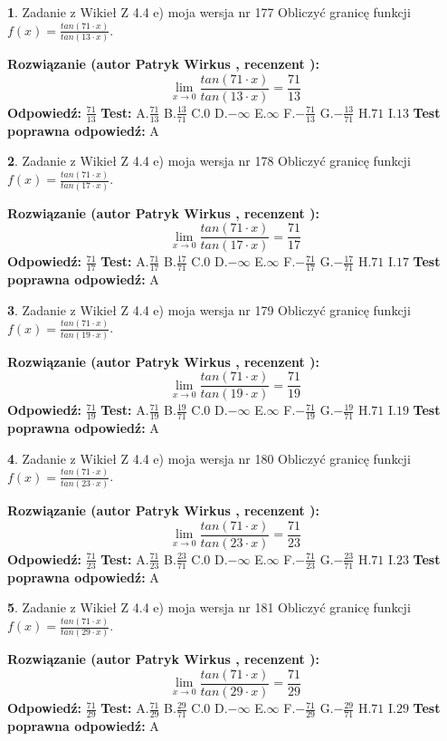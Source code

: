 \documentclass[12pt, a4paper]{article}
\theoremstyle{definition} %
\newtheorem{zad}{}
\newcommand{\zadStart}[1]{\begin{zad}#1\newline}
\newcommand{\zadStop}{\end{zad}}
\newcommand{\rozwStart}[2]{\noindent \textbf{Rozwiązanie (autor #1 , recenzent #2): }\newline}
\newcommand{\rozwStop}{\newline}
\newcommand{\odpStart}{\noindent \textbf{Odpowiedź:}\newline}
\newcommand{\odpStop}{\newline}
\newcommand{\testStart}{\noindent \textbf{Test:}\newline}
\newcommand{\testStop}{\newline}
\newcommand{\kluczStart}{\noindent \textbf{Test poprawna odpowiedź:}\newline}
\newcommand{\kluczStop}{\newline}
\begin{document}
\zadStart{Zadanie z Wikieł Z 4.4 e) moja wersja nr 177}
Obliczyć granicę funkcji $f(x)=\frac{tan(71\cdot x)}{tan(13\cdot x)}$.
\zadStop
\rozwStart{Patryk Wirkus}{}
$$\lim\limits_{x\to 0}\frac{tan(71\cdot x)}{tan(13\cdot x)}=
\frac{71}{13}$$
\rozwStop
\odpStart
$\frac{71}{13}$
\odpStop
\testStart
A.$\frac{71}{13}$
B.$\frac{13}{71}$
C.$0$
D.$-\infty$
E.$\infty$
F.$-\frac{71}{13}$
G.$-\frac{13}{71}$
H.$71$
I.$13$
\testStop
\kluczStart
A
\kluczStop



\zadStart{Zadanie z Wikieł Z 4.4 e) moja wersja nr 178}
Obliczyć granicę funkcji $f(x)=\frac{tan(71\cdot x)}{tan(17\cdot x)}$.
\zadStop
\rozwStart{Patryk Wirkus}{}
$$\lim\limits_{x\to 0}\frac{tan(71\cdot x)}{tan(17\cdot x)}=
\frac{71}{17}$$
\rozwStop
\odpStart
$\frac{71}{17}$
\odpStop
\testStart
A.$\frac{71}{17}$
B.$\frac{17}{71}$
C.$0$
D.$-\infty$
E.$\infty$
F.$-\frac{71}{17}$
G.$-\frac{17}{71}$
H.$71$
I.$17$
\testStop
\kluczStart
A
\kluczStop



\zadStart{Zadanie z Wikieł Z 4.4 e) moja wersja nr 179}
Obliczyć granicę funkcji $f(x)=\frac{tan(71\cdot x)}{tan(19\cdot x)}$.
\zadStop
\rozwStart{Patryk Wirkus}{}
$$\lim\limits_{x\to 0}\frac{tan(71\cdot x)}{tan(19\cdot x)}=
\frac{71}{19}$$
\rozwStop
\odpStart
$\frac{71}{19}$
\odpStop
\testStart
A.$\frac{71}{19}$
B.$\frac{19}{71}$
C.$0$
D.$-\infty$
E.$\infty$
F.$-\frac{71}{19}$
G.$-\frac{19}{71}$
H.$71$
I.$19$
\testStop
\kluczStart
A
\kluczStop



\zadStart{Zadanie z Wikieł Z 4.4 e) moja wersja nr 180}
Obliczyć granicę funkcji $f(x)=\frac{tan(71\cdot x)}{tan(23\cdot x)}$.
\zadStop
\rozwStart{Patryk Wirkus}{}
$$\lim\limits_{x\to 0}\frac{tan(71\cdot x)}{tan(23\cdot x)}=
\frac{71}{23}$$
\rozwStop
\odpStart
$\frac{71}{23}$
\odpStop
\testStart
A.$\frac{71}{23}$
B.$\frac{23}{71}$
C.$0$
D.$-\infty$
E.$\infty$
F.$-\frac{71}{23}$
G.$-\frac{23}{71}$
H.$71$
I.$23$
\testStop
\kluczStart
A
\kluczStop



\zadStart{Zadanie z Wikieł Z 4.4 e) moja wersja nr 181}
Obliczyć granicę funkcji $f(x)=\frac{tan(71\cdot x)}{tan(29\cdot x)}$.
\zadStop
\rozwStart{Patryk Wirkus}{}
$$\lim\limits_{x\to 0}\frac{tan(71\cdot x)}{tan(29\cdot x)}=
\frac{71}{29}$$
\rozwStop
\odpStart
$\frac{71}{29}$
\odpStop
\testStart
A.$\frac{71}{29}$
B.$\frac{29}{71}$
C.$0$
D.$-\infty$
E.$\infty$
F.$-\frac{71}{29}$
G.$-\frac{29}{71}$
H.$71$
I.$29$
\testStop
\kluczStart
A
\kluczStop
\end{document}
